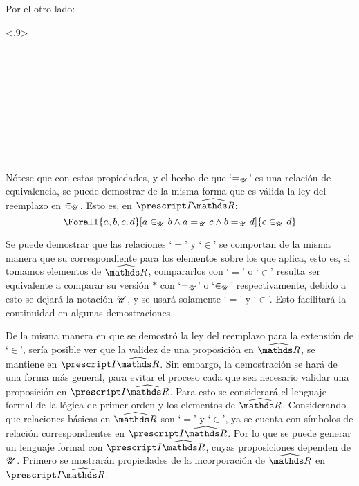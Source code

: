 \begin{demo}
  Por el otro lado:
  \begin{longderivation}<.9>
      \\
    \To\\
      \\
    \equiv\\
      \\
    \equiv\\
      \\
    \equiv\\
      \\
    \equiv\\
  \end{longderivation}
\end{demo}

Nótese que con estas propiedades, y el hecho de que `$=_{\mathscr{U}}$' es una
relación de equivalencia, se puede demostrar de la misma forma que
es válida la ley del reemplazo en $\in_{\mathscr{U}}$. Esto es, en $\IRh$:
\[\Forall{a,b,c,d}[a\inu b \land a\equ c \land b \equ d]{c\inu d}\]

Se puede demostrar que las relaciones `$=$' y `$\in$' se comportan de
la misma manera que su correspondiente para los elementos sobre los que
aplica, esto es, si tomamos elementos de $\Rh$, compararlos con `$=$' o
`$\in$' resulta ser equivalente a comparar su versión $*$ con `$=_{\mathscr{U}}$'
o `$\in_{\mathscr{U}}$' respectivamente, debido a esto se dejará la notación $\mathscr{U}$, y
se usará solamente `$=$' y `$\in$'. Esto facilitará la
continuidad en algunas demostraciones.

De la misma manera en que se demostró la ley del reemplazo para
la extensión de `$\in$', sería posible ver que la validez de una
proposición en $\Rh$, se mantiene en $\IRh$. Sin embargo, la
demostración se hará de una forma más general, para evitar el proceso
cada que sea necesario validar una proposición en $\IRh$. Para esto se
considerará el lenguaje formal de la lógica de primer orden y los
elementos de $\Rh$. Considerando que relaciones
básicas en $\Rh$ son `$=$' y `$\in$', ya se cuenta con símbolos de
relación correspondientes en $\IRh$. Por lo que se puede generar un
lenguaje formal con $\IRh$, cuyas proposiciones dependen de $\mathscr{U}$.
Primero se mostrarán propiedades de la incorporación de $\Rh$ en $\IRh$.

